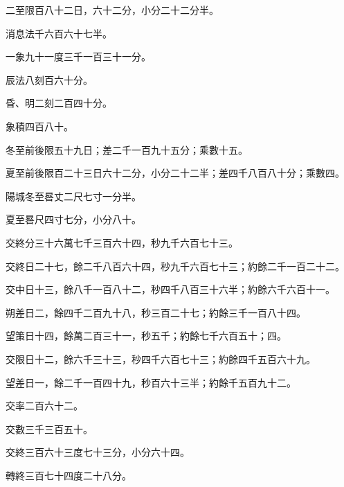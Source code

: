 \begin{pinyinscope}
 二至限百八十二日，六十二分，小分二十二分半。



 消息法千六百六十七半。



 一象九十一度三千一百三十一分。



 辰法八刻百六十分。



 昏、明二刻二百四十分。



 象積四百八十。



 冬至前後限五十九日；差二千一百九十五分；乘數十五。



 夏至前後限百二十三日六十二分，小分二十二半；差四千八百八十分；乘數四。



 陽城冬至晷丈二尺七寸一分半。



 夏至晷尺四寸七分，小分八十。



 交終分三十六萬七千三百六十四，秒九千六百七十三。



 交終日二十七，餘二千八百六十四，秒九千六百七十三；約餘二千一百二十二。



 交中日十三，餘八千一百八十二，秒四千八百三十六半；約餘六千六百十一。



 朔差日二，餘四千二百九十八，秒三百二十七；約餘三千一百八十四。



 望策日十四，餘萬二百三十一，秒五千；約餘七千六百五十；四。



 交限日十二，餘六千三十三，秒四千六百七十三；約餘四千五百六十九。



 望差日一，餘二千一百四十九，秒百六十三半；約餘千五百九十二。



 交率二百六十二。



 交數三千三百五十。



 交終三百六十三度七十三分，小分六十四。



 轉終三百七十四度二十八分。




\end{pinyinscope}
